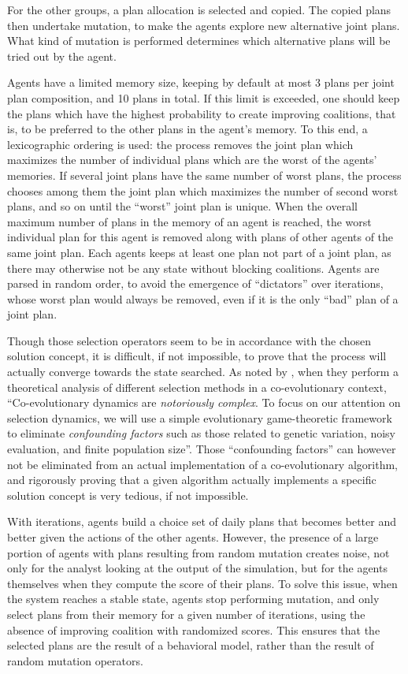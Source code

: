 {For the other groups, a plan allocation is selected and copied. The
copied plans then undertake mutation, to make the agents explore new
alternative joint plans. What kind of mutation is performed determines
which alternative plans will be tried out by the agent.

Agents have a limited memory size, keeping by default at most 3 plans per joint
plan composition, and 10 plans in total. If this limit is exceeded, one
should keep the plans which have the highest probability to create
improving coalitions, that is, to be preferred to the other plans in the
agent's memory. To this end, a lexicographic ordering is used: the
process removes the joint plan which maximizes the number of individual
plans which are the worst of the agents' memories. If several joint
plans have the same number of worst plans, the process chooses among
them the joint plan which maximizes the number of second worst plans,
and so on until the ``worst'' joint plan is unique. When the overall
maximum number of plans in the memory of an agent is reached, the worst
individual plan for this agent is removed along with plans of other
agents of the same joint plan. Each agents keeps at least one plan not
part of a joint plan, as there may otherwise not be any state without
blocking coalitions. Agents are parsed in random order, to avoid the
emergence of ``dictators'' over iterations, whose worst plan would
always be removed, even if it is the only ``bad'' plan of a joint plan.

Though those selection operators seem to be in accordance with the
chosen solution concept, it is difficult, if not impossible, to prove
that the process will actually converge towards the state searched. As
noted by , when they perform a theoretical
analysis of different selection methods in a co-evolutionary context,
``Co-evolutionary dynamics are \emph{notoriously complex}. To focus on
our attention on selection dynamics, we will use a simple evolutionary
game-theoretic framework to eliminate \emph{confounding factors} such as
those related to genetic variation, noisy evaluation, and finite
population size''. Those ``confounding factors'' can however not be
eliminated from an actual implementation of a co-evolutionary algorithm,
and rigorously proving that a given algorithm actually implements a
specific solution concept is very tedious, if not impossible.

With iterations, agents build a choice set of daily plans that becomes
better and better given the actions of the other agents. However, the
presence of a large portion of agents with plans resulting from random
mutation creates noise, not only for the analyst looking at the output
of the simulation, but for the agents themselves when they compute the
score of their plans. To solve this issue, when the system reaches a
stable state, agents stop performing mutation, and only select plans
from their memory for a given number of iterations, using the absence of improving
coalition with randomized scores. This ensures that the selected plans
are the result of a behavioral model, rather than the result of random
mutation operators.

}

